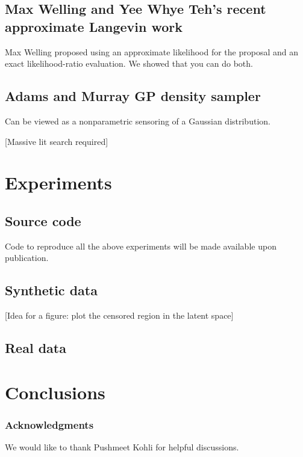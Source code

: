 \documentclass{article}
\begin{document}
\subsection{Max Welling and Yee Whye Teh's recent approximate Langevin work}

Max Welling proposed using an approximate likelihood for the proposal and an exact likelihood-ratio evaluation.  We showed that you can do both.

\subsection{ Adams and Murray GP density sampler }

Can be viewed as a nonparametric sensoring of a Gaussian distribution.

[Massive lit search required]


\section{Experiments}

\subsection{Source code}

Code to reproduce all the above experiments will be made available upon publication.


\subsection{Synthetic data}



[Idea for a figure: plot the censored region in the latent space]

\subsection{Real data}



\section{Conclusions}

\subsubsection*{Acknowledgments}

We would like to thank Pushmeet Kohli for helpful discussions.



\end{document}
